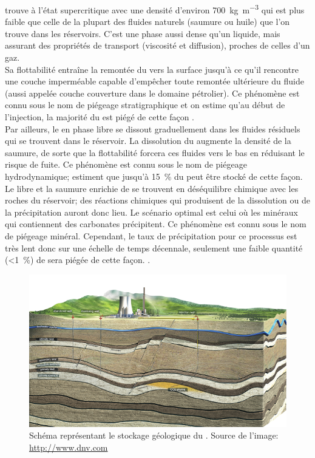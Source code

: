 trouve à l'état supercritique avec une densité d'environ
\SI{700}{\kg\per\cubic\meter} qui est plus faible que celle de la plupart des
fluides naturels (saumure ou huile) que l'on trouve dans les réservoirs. C'est
une phase aussi dense qu'un liquide, mais assurant des propriétés de transport
(viscosité et diffusion), proches de celles d'un gaz.\\
Sa flottabilité entraîne la remontée du  vers la surface jusqu'à ce
qu'il rencontre une couche imperméable capable d’empêcher toute remontée
ultérieure du fluide (aussi appelée couche couverture dans le domaine
pétrolier). Ce phénomène est connu sous le nom de piégeage stratigraphique et on
estime qu’au début de l'injection, la majorité du  est piégé de cette
façon \citep{Johnson2001}.\\
Par ailleurs, le  en phase libre se dissout graduellement dans les
fluides résiduels
qui se trouvent dans le réservoir. La dissolution du  augmente la
densité de la saumure, de sorte que la flottabilité forcera ces fluides vers le
bas en réduisant le risque de fuite. Ce phénomène est connu sous le nom de
piégeage hydrodynamique; \citet{Johnson2001} estiment que jusqu'à
\SI{15}{\percent} du  peut être stocké de cette façon.\\
Le  libre et la saumure enrichie de  se trouvent en déséquilibre
chimique avec les roches du réservoir; des réactions chimiques qui produisent de
la dissolution ou de la précipitation auront donc lieu. Le scénario optimal est
celui où les minéraux qui contiennent des carbonates précipitent. Ce phénomène
est connu sous le nom de piégeage minéral. Cependant, le taux de précipitation
pour ce processus est très lent donc sur une échelle de temps décennale,
seulement une faible quantité (\SI{<1}{\percent}) de  sera piégée de
cette façon. \citep{Johnson2001}.
\begin{figure}[ht]
\centering
\includegraphics[width=1\textwidth]{fig/ccs.pdf}
\caption{Schéma représentant le stockage géologique du . Source de
l'image: \url{http://www.dnv.com}}
\label{fig:ccs}
\end{figure}
